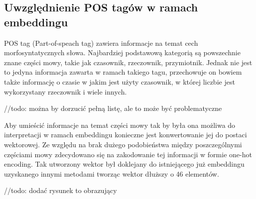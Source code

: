 \subsection{Uwzględnienie POS tagów w ramach embeddingu}


POS tag (Part-of-speach tag) zawiera informacje na temat cech morfosyntatycznych słowa. Najbardziej podstawową kategorią są powszechnie znane części mowy, takie jak czasownik, rzeczownik, przymiotnik. Jednak nie jest to jedyna informacja zawarta w ramach takiego tagu, przechowuje on bowiem także informację o czasie w jakim jest użyty czasownik, w której liczbie jest wykorzystany rzeczownik i wiele innych.  

//todo: można by dorzucić pełną listę, ale to może być problematyczne 
 

Aby umieścić informacje na temat części mowy tak by była ona możliwa do interpretacji w ramach embeddingu konieczne jest konwertowanie jej do postaci wektorowej. Ze względu na brak dużego podobieństwa między poszczególnymi częściami mowy zdecydowano się na zakodowanie tej informacji w formie one-hot encoding. Tak utworzony wektor był doklejany do istniejącego już embeddingu uzyskanego innymi metodami tworząc wektor dłuższy o 46 elementów. 

//todo: dodać rysunek to obrazujący